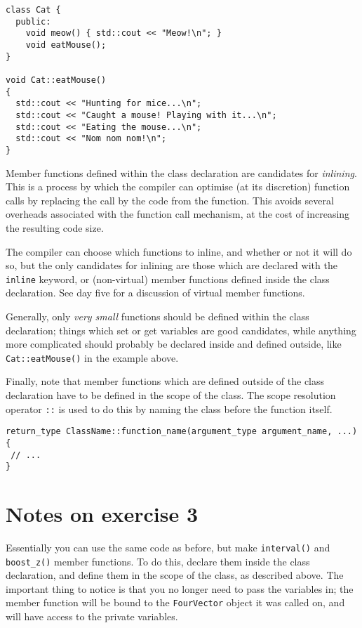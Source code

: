 \documentclass[a4paper]{scrartcl}
\begin{document}
\begin{verbatim}
class Cat {
  public:
    void meow() { std::cout << "Meow!\n"; }
    void eatMouse();
}

void Cat::eatMouse()
{
  std::cout << "Hunting for mice...\n";
  std::cout << "Caught a mouse! Playing with it...\n";
  std::cout << "Eating the mouse...\n";
  std::cout << "Nom nom nom!\n";
}
\end{verbatim}

Member functions defined within the class declaration are candidates for \emph{inlining}. This is a process by which the compiler can optimise (at its discretion) function calls by replacing the call by the code from the function. This avoids several overheads associated with the function call mechanism, at the cost of increasing the resulting code size.

The compiler can choose which functions to inline, and whether or not it will do so, but the only candidates for inlining are those which are declared with the \verb|inline| keyword, or (non-virtual) member functions defined inside the class declaration. See day five for a discussion of virtual member functions.

Generally, only \emph{very small} functions should be defined within the class declaration; things which set or get variables are good candidates, while anything more complicated should probably be declared inside and defined outside, like \verb|Cat::eatMouse()| in the example above.

Finally, note that member functions which are defined outside of the class declaration have to be defined in the scope of the class. The scope resolution operator \verb|::| is used to do this by naming the class before the function itself.

\begin{verbatim}
return_type ClassName::function_name(argument_type argument_name, ...)
{
 // ...
}
\end{verbatim}

\section{Notes on exercise 3}
Essentially you can use the same code as before, but make \verb|interval()| and \verb|boost_z()| member functions. To do this, declare them inside the class declaration, and define them in the scope of the class, as described above. The important thing to notice is that you no longer need to pass the variables in; the member function will be bound to the \verb|FourVector| object it was called on, and will have access to the private variables.
\end{document}
